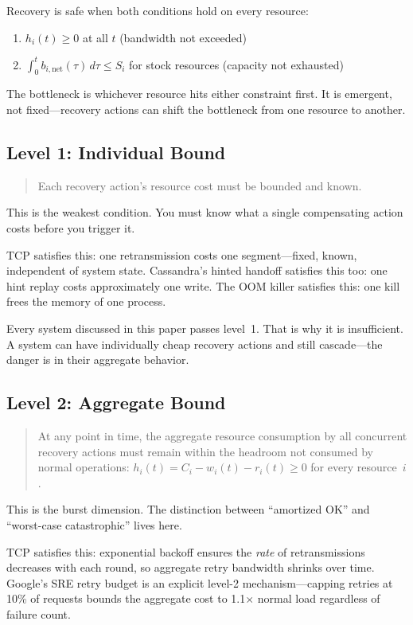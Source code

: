 \documentclass[11pt]{article}
\begin{document}
Recovery is safe when both conditions hold on every resource:
\begin{enumerate}
  \item $h_i(t) \geq 0$ at all $t$ (bandwidth not exceeded)
  \item $\int_0^t b_{i,\mathrm{net}}(\tau)\,d\tau \leq S_i$ for stock resources
    (capacity not exhausted)
\end{enumerate}

The bottleneck is whichever resource hits either constraint first. It is
emergent, not fixed---recovery actions can shift the bottleneck from one resource
to another.

\subsection{Level 1: Individual Bound}

\begin{quote}
Each recovery action's resource cost must be bounded and known.
\end{quote}

This is the weakest condition. You must know what a single compensating action
costs before you trigger it.

TCP satisfies this: one retransmission costs one segment---fixed, known,
independent of system state. Cassandra's hinted handoff satisfies this too: one
hint replay costs approximately one write. The OOM killer satisfies this: one
kill frees the memory of one process.

Every system discussed in this paper passes level~1. That is why it is
insufficient. A system can have individually cheap recovery actions and still
cascade---the danger is in their aggregate behavior.

\subsection{Level 2: Aggregate Bound}

\begin{quote}
At any point in time, the aggregate resource consumption by all concurrent
recovery actions must remain within the headroom not consumed by normal
operations: $h_i(t) = C_i - w_i(t) - r_i(t) \geq 0$ for every resource~$i$.
\end{quote}

This is the burst dimension. The distinction between ``amortized OK'' and
``worst-case catastrophic'' lives here.

TCP satisfies this: exponential backoff ensures the \emph{rate} of
retransmissions decreases with each round, so aggregate retry bandwidth shrinks
over time. Google's SRE retry budget is an explicit level-2 mechanism---capping
retries at 10\% of requests bounds the aggregate cost to 1.1$\times$
normal load regardless of failure count.
\end{document}
